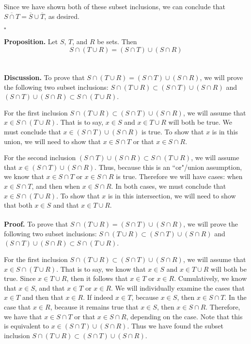 \documentclass[12pt]{exam}
\begin{document}
\begin{questions}
\par
Since we have shown both of these subset inclusions, we can conclude that $\overline{S \cap T} = \overline{S} \cup \overline{T}$, as desired.
\begin{flushright}
$\square$
\end{flushright}

\question
\textbf{Proposition.} Let $S$, $T$, and $R$ be sets. Then
\begin{equation*}
S \cap (T \cup R) = (S \cap T) \cup (S \cap R)
\end{equation*}
\\
\\\textbf{Discussion.} To prove that $S \cap (T \cup R) = (S \cap T) \cup (S \cap R)$, we will prove the following two subset inclusions: $S \cap (T \cup R) \subset (S \cap T) \cup (S \cap R)$ and $(S \cap T) \cup (S \cap R) \subset S \cap (T \cup R)$.
\par
For the first inclusion $S \cap (T \cup R) \subset (S \cap T) \cup (S \cap R)$, we will assume that $x \in S \cap (T \cup R)$. That is to say, $x \in S$ and $x \in T \cup R$ will both be true. We must conclude that $x \in (S \cap T) \cup (S \cap R)$ is true. To show that $x$ is in this union, we will need to show that $x \in S \cap T$ or that $x \in S \cap R$.
\par
For the second inclusion $(S \cap T) \cup (S \cap R) \subset S \cap (T \cup R)$, we will assume that $x \in (S \cap T) \cup (S \cap R)$. Thus, because this is an ``or"/union assumption, we know that $x \in S \cap T$ or $x \in S \cap R$ is true. Therefore we will have cases: when  $x \in S \cap T$, and then when $x \in S \cap R$. In both cases, we must conclude that $x \in S \cap (T \cup R)$. To show that $x$ is in this intersection, we will need to show that both $x \in S$ and that $x \in T \cup R$.
\\
\\\textbf{Proof.} To prove that $S \cap (T \cup R) = (S \cap T) \cup (S \cap R)$, we will prove the following two subset inclusions: $S \cap (T \cup R) \subset (S \cap T) \cup (S \cap R)$ and $(S \cap T) \cup (S \cap R) \subset S \cap (T \cup R)$.
\par
For the first inclusion $S \cap (T \cup R) \subset (S \cap T) \cup (S \cap R)$, we will assume that $x \in S \cap (T \cup R)$. That is to say, we know that $x \in S$ and $x \in T \cup R$ will both be true. Since $x \in T \cup R$, then it follows that  $x \in T$ or $x \in R$. Cumulatively, we know that $x \in S$, and that $x \in T$ or $x \in R$. We will individually examine the cases that $x \in T$ and then that $x \in R$. If indeed $x \in T$, because $x \in S$, then $x \in S \cap T$. In the case that $x \in R$, because it remains true that $x \in S$, then $x \in S \cap R$. Therefore, we have that $x \in S \cap T$ or that    $x \in S \cap R$, depending on the case. Note that this is equivalent to $x \in (S \cap T) \cup (S \cap R)$. Thus we have found the subset inclusion $S \cap (T \cup R) \subset (S \cap T) \cup (S \cap R)$.

\end{questions}
\end{document}
